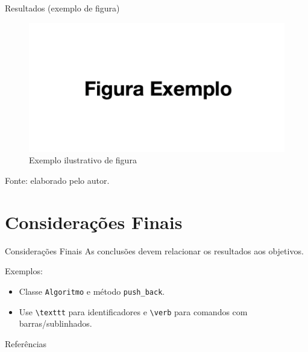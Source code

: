 \documentclass[aspectratio=169]{beamer}
\begin{document}
\begin{frame}{Resultados (exemplo de figura)}
\begin{figure}
  \includegraphics[width=0.72\linewidth]{figura.png}
  \caption{Exemplo ilustrativo de figura}
\end{figure}
{\tiny Fonte: elaborado pelo autor.}
\end{frame}

\section{Considerações Finais}

\begin{frame}[fragile]{Considerações Finais}
As conclusões devem relacionar os resultados aos objetivos.

Exemplos:
\begin{itemize}
  \item Classe \texttt{Algoritmo} e método \verb|push_back|.
  \item Use \verb|\texttt| para identificadores e \verb|\verb| para comandos com barras/sublinhados.
\end{itemize}
\end{frame}

\begin{frame}[allowframebreaks]{Referências}
\printbibliography[heading=none]
\end{frame}
\end{document}
